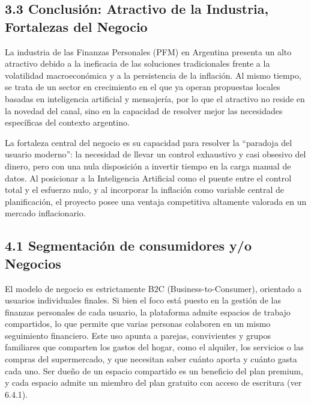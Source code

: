 \subsection*{3.3 Conclusión: Atractivo de la Industria, Fortalezas del
Negocio}\label{conclusiuxf3n-atractivo-de-la-industria-fortalezas-del-negocio}

La industria de las Finanzas Personales (PFM) en Argentina presenta un
alto atractivo debido a la ineficacia de las soluciones tradicionales
frente a la volatilidad macroeconómica y a la persistencia de la
inflación. Al mismo tiempo, se trata de un sector en crecimiento en el
que ya operan propuestas locales basadas en inteligencia artificial y
mensajería, por lo que el atractivo no reside en la novedad del canal,
sino en la capacidad de resolver mejor las necesidades específicas del
contexto argentino.

La fortaleza central del negocio es su capacidad para resolver la
``paradoja del usuario moderno'': la necesidad de llevar un control
exhaustivo y casi obsesivo del dinero, pero con una nula disposición a
invertir tiempo en la carga manual de datos. Al posicionar a la
Inteligencia Artificial como el puente entre el control total y el
esfuerzo nulo, y al incorporar la inflación como variable central de
planificación, el proyecto posee una ventaja competitiva altamente
valorada en un mercado inflacionario.


\subsection*{4.1 Segmentación de consumidores y/o
Negocios}\label{segmentaciuxf3n-de-consumidores-yo-negocios}

El modelo de negocio es estrictamente B2C (Business-to-Consumer),
orientado a usuarios individuales finales. Si bien el foco está puesto
en la gestión de las finanzas personales de cada usuario, la plataforma
admite espacios de trabajo compartidos, lo que permite que varias
personas colaboren en un mismo seguimiento financiero. Este uso apunta a
parejas, convivientes y grupos familiares que comparten los gastos del
hogar, como el alquiler, los servicios o las compras del supermercado, y
que necesitan saber cuánto aporta y cuánto gasta cada uno. Ser dueño de
un espacio compartido es un beneficio del plan premium, y cada espacio
admite un miembro del plan gratuito con acceso de escritura (ver 6.4.1).

